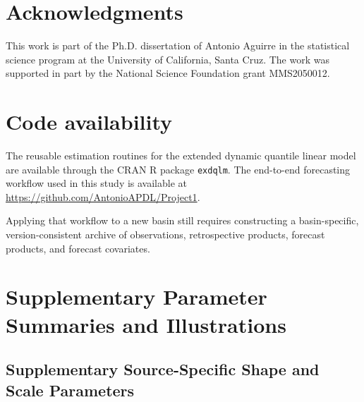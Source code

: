 \documentclass[APA,STIX1COL]{WileyNJD-v2}
\begin{document}
\section*{Acknowledgments}

This work is part of the Ph.D. dissertation of Antonio Aguirre in the statistical science program at the University of California, Santa Cruz. The work was supported in part by the National Science
Foundation grant MMS2050012.

\section*{Code availability}

The reusable estimation routines for the extended dynamic quantile linear model are available through the CRAN R package \texttt{exdqlm}. The end-to-end forecasting workflow used in this study is available at \url{https://github.com/AntonioAPDL/Project1}.

Applying that workflow to a new basin still requires constructing a basin-specific, version-consistent archive of observations, retrospective products, forecast products, and forecast covariates.






\clearpage


\appendix

\section{Supplementary Parameter Summaries and Illustrations}
\label{app:extras}

\subsection{Supplementary Source-Specific Shape and Scale Parameters}
\label{app:sourceparams}
\end{document}
